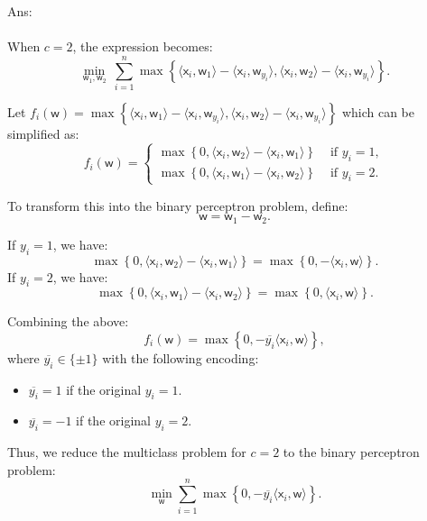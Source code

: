 \documentclass[10pt]{article}
\newcommand{\inner}[2]{\langle #1, #2 \rangle}
\newcommand{\xbs}{\bm{\mathsf{x}}}
\newcommand{\wbs}{\bm{\mathsf{w}}}
\newcommand{\ans}[1]{{\color{orange}\textsf{Ans}: #1}}
\begin{document}
\begin{exercise}
\begin{enumerate}
          \ans\\
          \leavevmode\\
          When $c=2$, the expression becomes:
          $$
            \min_{\wbs_1, \wbs_2} ~ \sum_{i=1}^n \max \left\{ \inner{\xbs_i}{\wbs_1} - \inner{\xbs_i}{\wbs_{y_i}}, \inner{\xbs_i}{\wbs_2} - \inner{\xbs_i}{\wbs_{y_i}} \right\}.
          $$

          Let $f_i(\wbs)=\max \left\{ \inner{\xbs_i}{\wbs_1} - \inner{\xbs_i}{\wbs_{y_i}}, \inner{\xbs_i}{\wbs_2} - \inner{\xbs_i}{\wbs_{y_i}} \right\}$ which can be simplified as:
          $$
            f_i(\wbs) =
            \begin{cases}
              \max \left\{ 0, \inner{\xbs_i}{\wbs_2} - \inner{\xbs_i}{\wbs_1} \right\} & \text{ if } y_i = 1, \\
              \max \left\{0, \inner{\xbs_i}{\wbs_1} - \inner{\xbs_i}{\wbs_2}\right\}   & \text{ if } y_i = 2.
            \end{cases}
          $$

          To transform this into the binary perceptron problem, define:
          $$
            \wbs = \wbs_1 - \wbs_2.
          $$

          If $y_i = 1$, we have:
          $$
            \max \left\{ 0, \inner{\xbs_i}{\wbs_2} - \inner{\xbs_i}{\wbs_1} \right\} = \max \left\{ 0, -\inner{\xbs_i}{\wbs} \right\}.
          $$
          If $y_i = 2$, we have:
          $$
            \max \left\{ 0,\inner{\xbs_i}{\wbs_1} - \inner{\xbs_i}{\wbs_2}\right\} = \max \left\{ 0,\inner{\xbs_i}{\wbs}\right\}.
          $$

          Combining the above:
          $$
            f_i(\wbs)=\max \left\{ 0, -\overline{y_i} \inner{\xbs_i}{\wbs} \right\},
          $$
          where $\overline{y_i} \in \{\pm1\}$ with the following encoding:
          \begin{itemize}
            \item $\overline{y_i} = 1$ if the original $y_i = 1$.
            \item $\overline{y_i} = -1$ if the original $y_i = 2$.
          \end{itemize}

          Thus, we reduce the multiclass problem for $c=2$ to the binary perceptron problem:
          $$
            \min_{\wbs} \sum_{i=1}^n \max \left\{ 0, -\overline{y_i} \inner{\xbs_i}{\wbs} \right\}.
          $$
          {\vskip0.5cm}


\end{enumerate}
\end{exercise}
\end{document}
